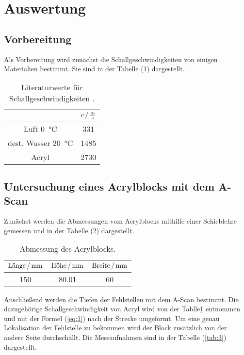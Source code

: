 \section{Auswertung}
\subsection{Vorbereitung}
Als Vorbereitung wird zunächst die Schallgeschwindigkeiten von einigen Materialien bestimmt. Sie sind in
der Tabelle (\ref{tab:1}) dargestellt.
\begin{table}[H]
  \centering
  \caption{Literaturwerte für Schallgeschwindigkeiten \cite{2} \cite{3}.}
  \label{tab:1}
  \begin{tabular}{c c}
    \toprule
     & $c \, / \, \si[per-mode=fraction]{\meter\per\second}$\\
     \midrule
     Luft \SI{0}{\celsius}          & 331  \\
     dest. Wasser \SI{20}{\celsius} & 1485 \\
     Acryl                          & 2730 \\
     \bottomrule
  \end{tabular}
\end{table}

\subsection{Untersuchung eines Acrylblocks mit dem A-Scan}
Zunächst werden die Abmessungen vom Acrylblocks mithilfe einer Schieblehre gemessen und in
der Tabelle (\ref{tab:2}) dargestellt.

\begin{table}[H]
  \centering
  \caption{Abmessung des Acrylblocks.}
  \label{tab:2}
  \begin{tabular}{c c c}
    \toprule
     $\text{Länge} \,/\, \si[per-mode=fraction]{\milli\meter}$ &$\text{Höhe} \, /\, \si[per-mode=fraction]{\milli\meter}$ &$\text{Breite} \, /\, \si[per-mode=fraction]{\milli\meter}$\\
     \midrule
     150 & 80.01 & 60 \\
     \bottomrule
  \end{tabular}
\end{table}

Anschließend werden die Tiefen der Fehlstellen mit dem A-Scan bestimmt. Die dazugehörige Schallgeschwindigkeit
von Acryl wird von der Tablle{\ref{tab:1}} entnommen und mit der Formel (\ref{eq:1}) nach der Strecke umgeformt.
Um eine genau Lokalisation der Fehlstelle zu bekommen wird der Block zusätzlich von der andere Seite durchschallt.
Die Messaufnahmen sind in der Tabelle (\ref{tab:3}) dargestellt.

